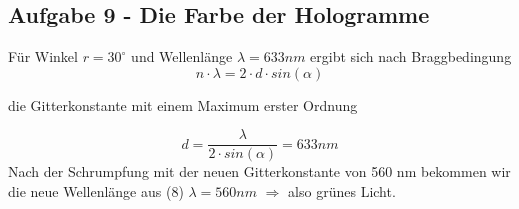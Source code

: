 \subsection*{Aufgabe 9 - Die Farbe der Hologramme}
Für Winkel $r = 30^{\circ}$ und Wellenlänge $\lambda = 633 nm$ ergibt sich nach Braggbedingung 
\begin{equation}
	n \cdot \lambda = 2 \cdot d\cdot sin \left( \alpha \right)
\end{equation}

die Gitterkonstante mit einem Maximum erster Ordnung

\begin{equation}
	d = \frac{\lambda}{2 \cdot sin \left(\alpha \right)} = 633 nm
\end{equation} 
Nach der Schrumpfung mit der neuen Gitterkonstante von 560 nm bekommen wir die neue Wellenlänge aus (8) $\lambda = 560 nm$ $\Rightarrow$ also grünes Licht.